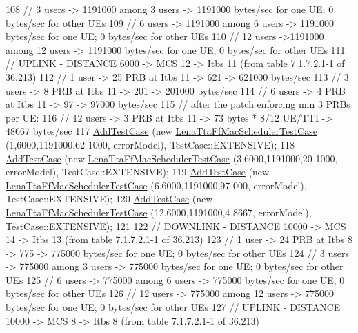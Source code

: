 \begin{DoxyCode}
108   \textcolor{comment}{// 3 users -> 1191000 among 3 users -> 1191000 bytes/sec for one UE; 0 bytes/sec for other UEs}
109   \textcolor{comment}{// 6 users -> 1191000 among 6 users -> 1191000 bytes/sec for one UE; 0 bytes/sec for other UEs}
110   \textcolor{comment}{// 12 users ->1191000 among 12 users -> 1191000 bytes/sec for one UE; 0 bytes/sec for other UEs}
111   \textcolor{comment}{// UPLINK - DISTANCE 6000 -> MCS 12 -> Itbs 11 (from table 7.1.7.2.1-1 of 36.213)}
112   \textcolor{comment}{// 1 user -> 25 PRB at Itbs 11 -> 621 -> 621000 bytes/sec}
113   \textcolor{comment}{// 3 users -> 8 PRB at Itbs 11 -> 201 -> 201000 bytes/sec}
114   \textcolor{comment}{// 6 users -> 4 PRB at Itbs 11 -> 97 -> 97000 bytes/sec}
115   \textcolor{comment}{// after the patch enforcing min 3 PRBs per UE:}
116   \textcolor{comment}{// 12 users -> 3 PRB at Itbs 11 -> 73 bytes * 8/12 UE/TTI -> 48667 bytes/sec}
117   \hyperlink{classns3_1_1TestCase_a3718088e3eefd5d6454569d2e0ddd835}{AddTestCase} (\textcolor{keyword}{new} \hyperlink{classLenaTtaFfMacSchedulerTestCase}{LenaTtaFfMacSchedulerTestCase} (1,6000,1191000,62
      1000, errorModel), TestCase::EXTENSIVE);
118   \hyperlink{classns3_1_1TestCase_a3718088e3eefd5d6454569d2e0ddd835}{AddTestCase} (\textcolor{keyword}{new} \hyperlink{classLenaTtaFfMacSchedulerTestCase}{LenaTtaFfMacSchedulerTestCase} (3,6000,1191000,20
      1000, errorModel), TestCase::EXTENSIVE);
119   \hyperlink{classns3_1_1TestCase_a3718088e3eefd5d6454569d2e0ddd835}{AddTestCase} (\textcolor{keyword}{new} \hyperlink{classLenaTtaFfMacSchedulerTestCase}{LenaTtaFfMacSchedulerTestCase} (6,6000,1191000,97
      000, errorModel), TestCase::EXTENSIVE);
120   \hyperlink{classns3_1_1TestCase_a3718088e3eefd5d6454569d2e0ddd835}{AddTestCase} (\textcolor{keyword}{new} \hyperlink{classLenaTtaFfMacSchedulerTestCase}{LenaTtaFfMacSchedulerTestCase} (12,6000,1191000,4
      8667, errorModel), TestCase::EXTENSIVE);
121 
122   \textcolor{comment}{// DOWNLINK - DISTANCE 10000 -> MCS 14 -> Itbs 13 (from table 7.1.7.2.1-1 of 36.213)}
123   \textcolor{comment}{// 1 user -> 24 PRB at Itbs 8 -> 775 -> 775000 bytes/sec for one UE; 0 bytes/sec for other UEs}
124   \textcolor{comment}{// 3 users -> 775000 among 3 users -> 775000 bytes/sec for one UE; 0 bytes/sec for other UEs}
125   \textcolor{comment}{// 6 users -> 775000 among 6 users -> 775000 bytes/sec for one UE; 0 bytes/sec for other UEs}
126   \textcolor{comment}{// 12 users -> 775000 among 12 users -> 775000 bytes/sec for one UE; 0 bytes/sec for other UEs}
127   \textcolor{comment}{// UPLINK - DISTANCE 10000 -> MCS 8 -> Itbs 8 (from table 7.1.7.2.1-1 of 36.213)}

\end{DoxyCode}
